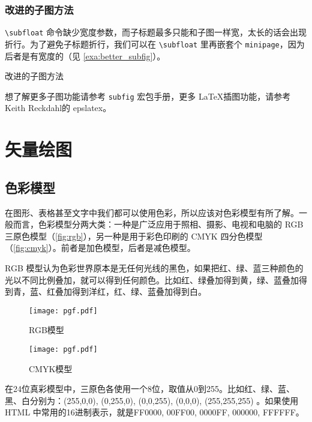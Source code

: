 \subsubsection{改进的子图方法}

\verb|\subfloat| 命令缺少宽度参数，而子标题最多只能和子图一样宽，太长的话会出现折行。为了避免子标题折行，我们可以在 \verb|\subfloat| 里再嵌套个 \texttt{minipage}，因为后者是有宽度的（见 \autoref{exa:better_subfig}）。

\begin{example}[htbp]
\caption{改进的子图方法}
\label{exa:better_subfig}
\end{example}

想了解更多子图功能请参考 \texttt{subfig} 宏包手册\citep{Cochran_subfig}，更多 \LaTeX 插图功能，请参考 Keith Reckdahl\indexReckdahl 的 epslatex\citep{Reckdahl_epslatex}。

\section{矢量绘图}
\label{sec:draft}

\subsection{色彩模型}

在图形、表格甚至文字中我们都可以使用色彩，所以应该对色彩模型有所了解。一般而言，色彩模型分两大类：一种是广泛应用于照相、摄影、电视和电脑的 RGB 三原色模型（\autoref{fig:rgb}），另一种是用于彩色印刷的 CMYK 四分色模型（\autoref{fig:cmyk}）。前者是加色模型，后者是减色模型。

RGB 模型认为色彩世界原本是无任何光线的黑色，如果把红、绿、蓝三种颜色的光以不同比例叠加，就可以得到任何颜色。比如红、绿叠加得到黄，绿、蓝叠加得到青，蓝、红叠加得到洋红，红、绿、蓝叠加得到白。

\begin{figure}[htbp]
\centering
\begin{minipage}{140pt}
\texttt{[image: pgf.pdf]}
\caption{RGB模型}
\label{fig:rgb}
\end{minipage}
\hspace{10pt}%
\begin{minipage}{140pt}
\texttt{[image: pgf.pdf]}
\caption{CMYK模型}
\label{fig:cmyk}
\end{minipage}
\end{figure}

在24位真彩模型中，三原色各使用一个8位，取值从0到255。比如红、绿、蓝、黑、白分别为：(255,0,0), (0,255,0), (0,0,255), (0,0,0), (255,255,255) 。如果使用 HTML 中常用的16进制表示，就是FF0000, 00FF00, 0000FF, 000000, FFFFFF。

